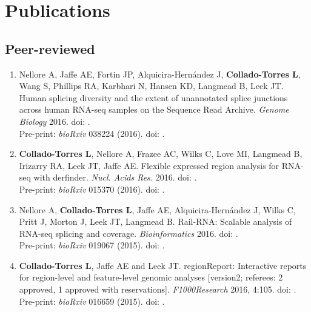 \section{Publications}
\subsection{Peer-reviewed}
    \begin{enumerate}
        \item Nellore A, Jaffe AE, Fortin JP, Alquicira-Hernández J, \textbf{Collado-Torres L}, Wang S, Phillips RA, Karbhari N, Hansen KD, Langmead B, Leek JT. Human splicing diversity and the extent of unannotated splice junctions across human RNA-seq samples on the Sequence Read Archive. \emph{Genome Biology} 2016. doi: .
        \\ Pre-print: \emph{bioRxiv} 038224 (2016). doi: .
        
        \item \textbf{Collado-Torres L}, Nellore A, Frazee AC, Wilks C, Love MI, Langmead B, Irizarry RA, Leek JT, Jaffe AE. Flexible expressed region analysis for RNA-seq with derfinder. \emph{Nucl. Acids Res.} 2016. doi: .
        \\ Pre-print: \emph{bioRxiv} 015370 (2016). doi: .
        
        \item Nellore A, \textbf{Collado-Torres L}, Jaffe AE, Alquicira-Hernández J, Wilks C, Pritt J, Morton J, Leek JT, Langmead B. Rail-RNA: Scalable analysis of RNA-seq splicing and coverage. \emph{Bioinformatics} 2016. doi: .
        \\ Pre-print: \emph{bioRxiv} 019067 (2015). doi: .
        
        \item \textbf{Collado-Torres L}, Jaffe AE and Leek JT. regionReport: Interactive reports for region-level and feature-level genomic analyses [version2; referees: 2 approved, 1 approved with reservations]. \emph{F1000Research} 2016, 4:105. doi: .
        \\ Pre-print: \emph{bioRxiv} 016659 (2015). doi: .
        

\end{enumerate}
